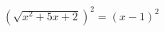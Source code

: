 \documentclass[preview]{standalone}
\begin{document}
\begin{center}
 $\left(\sqrt{x^2 + 5x + 2}\right)^2 = (x - 1)^2$
\end{center}
\end{document}
